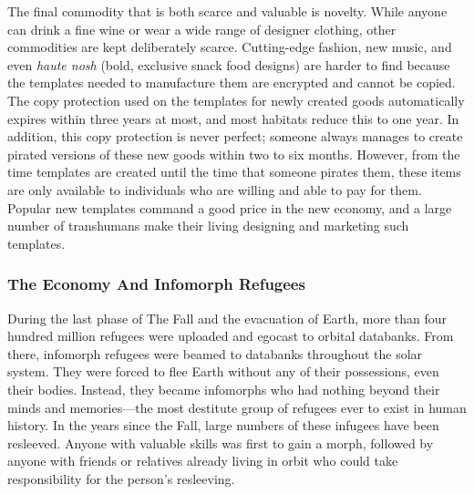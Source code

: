 The final commodity that is both scarce and valuable is novelty. While anyone can drink a fine wine 
or wear a wide range of designer clothing, other 
commodities are kept deliberately scarce. Cutting-edge fashion, new music, and even \textit{haute nosh }(bold, 
exclusive snack food designs) are harder to find because the templates needed to manufacture them are 
encrypted and cannot be copied. The copy protection 
used on the templates for newly created goods automatically expires within three years at most, and most 
habitats reduce this to one year. In addition, this copy 
protection is never perfect; someone always manages 
to create pirated versions of these new goods within 
two to six months. However, from the time templates 
are created until the time that someone pirates them, 
these items are only available to individuals who are 
willing and able to pay for them. Popular new templates command a good price in the new economy, 
and a large number of transhumans make their living 
designing and marketing such templates.

\subsubsection{The Economy And Infomorph Refugees}

During the last phase of The Fall and the evacuation 
of Earth, more than four hundred million refugees 
were uploaded and egocast to orbital databanks. From 
there, infomorph refugees were beamed to databanks 
throughout the solar system. They were forced to flee 
Earth without any of their possessions, even their 
bodies. Instead, they became infomorphs who had 
nothing beyond their minds and memories—the most 
destitute group of refugees ever to exist in human history. In the years since the Fall, large numbers of these 
infugees have been resleeved. Anyone with valuable 
skills was first to gain a morph, followed by anyone 
with friends or relatives already living in orbit who 
could take responsibility for the person's resleeving.

